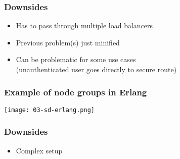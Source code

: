 \begin{frame}
    \frametitle{Downsides}
    \begin{itemize}
        \item Has to pass through multiple load balancers
        \item Previous problem(s) just minified
        \item Can be problematic for some use cases \\ 
        (unauthenticated user goes directly to secure route)
    \end{itemize}
\end{frame}



\begin{frame}
    \frametitle{Example of node groups in Erlang}
    \begin{center}
        \texttt{[image: 03-sd-erlang.png]}
    \end{center}
\end{frame}

\begin{frame}
    \frametitle{Downsides}
    \begin{itemize}
        \item Complex setup
    \end{itemize}
\end{frame}
